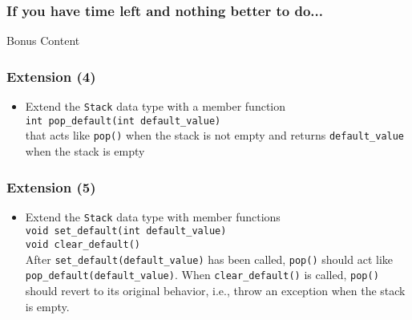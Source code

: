 \documentclass[10pt,aspectratio=169]{beamer}
\begin{document}
\begin{frame}[fragile]
	\frametitle{If you have time left and nothing better to do...}
	\begin{center}
		\LARGE Bonus Content
	\end{center}
\end{frame}

\begin{frame}[fragile]
	\frametitle{Extension (4)}  
	\begin{itemize}
	\item Extend the \texttt{Stack} data type with a member function\\[1ex]
	  \verb!int pop_default(int default_value)!\\[1ex]
	  that acts like \texttt{pop()} when the stack is not empty and
	  returns \verb!default_value! when the stack is empty
	\end{itemize}
  \end{frame}
  
  \begin{frame}[fragile]
	\frametitle{Extension (5)}  
	\begin{itemize}
	\item Extend the \texttt{Stack} data type with member functions\\[1ex]
	  \verb!void set_default(int default_value)!\\
	  \verb!void clear_default()!\\[1ex]
	  After \verb!set_default(default_value)! has been called, \texttt{pop()}
	  should act like \verb!pop_default(default_value)!. When
	  \verb!clear_default()! is called, \texttt{pop()} should revert to
	  its original behavior, i.e., throw an exception when the stack is
	  empty.
	\end{itemize}
  \end{frame}
  
\end{document}
